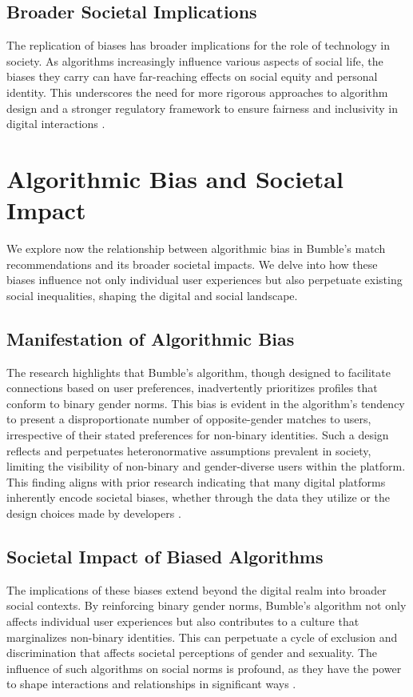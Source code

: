 \subsection{Broader Societal Implications}
The replication of biases has broader implications for the role of technology in society. As algorithms increasingly influence various aspects of social life, the biases they carry can have far-reaching effects on social equity and personal identity. This underscores the need for more rigorous approaches to algorithm design and a stronger regulatory framework to ensure fairness and inclusivity in digital interactions \cite{Lambrecht_Tucker_2019}.

\section{Algorithmic Bias and Societal Impact}
We explore now the relationship between algorithmic bias in Bumble's match recommendations and its broader societal impacts. We delve into how these biases influence not only individual user experiences but also perpetuate existing social inequalities, shaping the digital and social landscape.

\subsection{Manifestation of Algorithmic Bias}
The research highlights that Bumble's algorithm, though designed to facilitate connections based on user preferences, inadvertently prioritizes profiles that conform to binary gender norms. This bias is evident in the algorithm's tendency to present a disproportionate number of opposite-gender matches to users, irrespective of their stated preferences for non-binary identities. Such a design reflects and perpetuates heteronormative assumptions prevalent in society, limiting the visibility of non-binary and gender-diverse users within the platform. This finding aligns with prior research indicating that many digital platforms inherently encode societal biases, whether through the data they utilize or the design choices made by developers \cite{Noble_2018, Benjamin_2019}.

\subsection{Societal Impact of Biased Algorithms}
The implications of these biases extend beyond the digital realm into broader social contexts. By reinforcing binary gender norms, Bumble's algorithm not only affects individual user experiences but also contributes to a culture that marginalizes non-binary identities. This can perpetuate a cycle of exclusion and discrimination that affects societal perceptions of gender and sexuality. The influence of such algorithms on social norms is profound, as they have the power to shape interactions and relationships in significant ways \cite{Eubanks_2018}.

